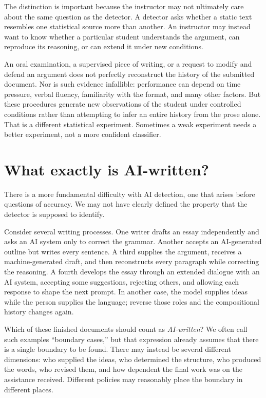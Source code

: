 \documentclass[pdflatex,sn-mathphys-num]{sn-jnl}
\begin{document}
The distinction is important because the instructor may not ultimately care about the same question as the detector. 
A detector asks whether a static text resembles one statistical source more than another. An instructor may instead want 
to know whether a particular student understands the argument, can reproduce its reasoning, or can extend it under new 
conditions.

An oral examination, a supervised piece of writing, or a request to modify and defend an argument does not perfectly 
reconstruct the history of the submitted document. Nor is such evidence infallible: performance can depend on time 
pressure, verbal fluency, familiarity with the format, and many other factors. But these procedures generate new
observations of the student under controlled conditions rather than attempting to infer an entire history from the 
prose alone. That is a different statistical experiment. Sometimes a weak experiment needs a better experiment, not a more confident classifier.

\section*{What exactly is AI-written?}
There is a more fundamental difficulty with AI detection, one that arises before questions of
accuracy. We may not have clearly defined the property that the detector is supposed to identify.

Consider several writing processes. One writer drafts an essay independently and asks an AI system
only to correct the grammar. Another accepts an AI-generated outline but writes every sentence. A
third supplies the argument, receives a machine-generated draft, and then reconstructs every
paragraph while correcting the reasoning. A fourth develops the essay through an extended dialogue
with an AI system, accepting some suggestions, rejecting others, and allowing each response to shape
the next prompt. In another case, the model supplies ideas while the person supplies the language;
reverse those roles and the compositional history changes again.

Which of these finished documents should count as \emph{AI-written}? We often call such examples ``boundary
cases,'' but that expression already assumes that there is a single boundary to be found. There may
instead be several different dimensions: who supplied the ideas, who determined the structure, who
produced the words, who revised them, and how dependent the final work was on the assistance
received. Different policies may reasonably place the boundary in different places.
\end{document}
